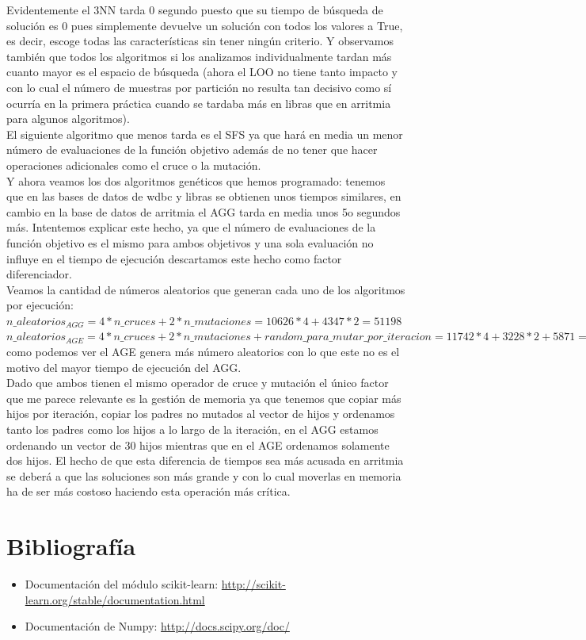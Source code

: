 \documentclass[10pt,a4paper]{article}
\begin{document}
Evidentemente el 3NN tarda 0 segundo puesto que su tiempo de búsqueda de solución es 0 pues simplemente devuelve un solución con todos los valores a True, es decir, escoge todas las características sin tener ningún criterio. Y observamos también que todos los algoritmos si los analizamos individualmente tardan más cuanto mayor es el espacio de búsqueda (ahora el LOO no tiene tanto impacto y con lo cual el número de muestras por partición no resulta tan decisivo como sí ocurría en la primera práctica cuando se tardaba más en libras que en arritmia para algunos algoritmos).\\

El siguiente algoritmo que menos tarda es el SFS ya que hará en media un menor número de evaluaciones de la función objetivo además de no tener que hacer operaciones adicionales como el cruce o la mutación.\\

Y ahora veamos los dos algoritmos genéticos que hemos programado: tenemos que en las bases de datos de wdbc y libras se obtienen unos tiempos similares, en cambio en la base de datos de arritmia el AGG tarda en media unos 5o segundos más. Intentemos explicar este hecho, ya que el número de evaluaciones de la función objetivo es el mismo para ambos objetivos y una sola evaluación no influye en el tiempo de ejecución descartamos este hecho como factor diferenciador.\\

Veamos la cantidad de números aleatorios que generan cada uno de los algoritmos por ejecución:\\

$n\_aleatorios_{AGG} = 4*n\_cruces + 2*n\_mutaciones = 10626*4 + 4347*2 = 51198$\\

$n\_aleatorios_{AGE} = 4*n\_cruces + 2*n\_mutaciones + random\_para\_mutar\_por\_iteracion = 11742*4 + 3228*2 + 5871 = 59295$\\

como podemos ver el AGE genera más número aleatorios con lo que este no es el motivo del mayor tiempo de ejecución del AGG.\\

Dado que ambos tienen el mismo operador de cruce y mutación el único factor que me parece relevante es la gestión de memoria ya que tenemos que copiar más hijos por iteración, copiar los padres no mutados al vector de hijos y ordenamos tanto los padres como los hijos a lo largo de la iteración, en el AGG estamos ordenando un vector de 30 hijos mientras que en el AGE ordenamos solamente dos hijos. El hecho de que esta diferencia de tiempos sea más acusada en arritmia se deberá a que las soluciones son más grande y con lo cual moverlas en memoria ha de ser más costoso haciendo esta operación más crítica.\\

\newpage
\section{\color[rgb]{0.0,0.0,0.21}Bibliografía}

\begin{itemize}
\item Documentación del módulo scikit-learn: \url{http://scikit-learn.org/stable/documentation.html}
\item Documentación de Numpy: \url{http://docs.scipy.org/doc/}
\end{itemize}
\end{document}
